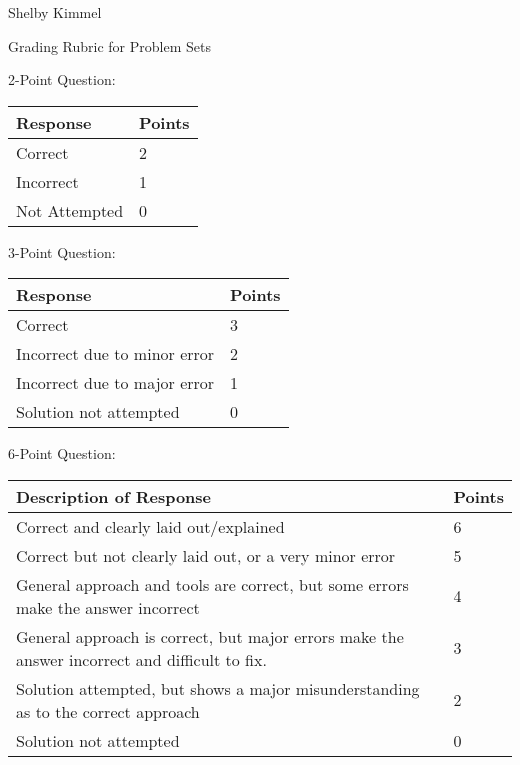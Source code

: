 \documentclass[12pt,landscape]{article}
\begin{document}
\hfill Shelby Kimmel

\begin{center}
{\huge Grading Rubric for Problem Sets}
\end{center}
\bigskip
\begin{multicols}{2}


{\large 2-Point Question:}


{\renewcommand{\arraystretch}{2}
\begin{tabular}{|p{4cm}|p{3cm}|}
\hline
{\bf Response}& {\bf Points}\\
\hline
  Correct &2 \\
  \hline 
  Incorrect &1 \\
  \hline
  Not Attempted &0 \\
  \hline
\end{tabular}}

\bigskip\bigskip
{\large 3-Point Question:}


{\renewcommand{\arraystretch}{2}
\begin{tabular}{|p{5cm}|p{2cm}|}
\hline
{\bf Response}& {\bf Points}\\
\hline
  Correct &3 \\  
  Incorrect due to minor error &2 \\  
  Incorrect due to major error &1 \\  
  Solution not attempted &0 \\
  \hline
\end{tabular}}

\vfill
\vspace{1cm}

{\large 6-Point Question:}


{\renewcommand{\arraystretch}{2}
\begin{tabular}{|p{7.5cm}|p{2cm}|}
\hline
{\bf Description of Response}& {\bf Points}\\
\hline
  Correct and clearly laid out/explained & 6\\
  \hline
  Correct but not clearly laid out, or a very minor error &5 \\
  \hline  
  General approach and tools are correct, but some errors make the answer incorrect &4 \\
  \hline  
  General approach is correct, but major errors make the answer incorrect and difficult to fix. &3 \\
  \hline  
  Solution attempted, but shows a major misunderstanding as to the correct approach & 2\\
  \hline
  Solution not attempted &0 \\
  \hline
\end{tabular}}


\end{multicols}
\end{document}
